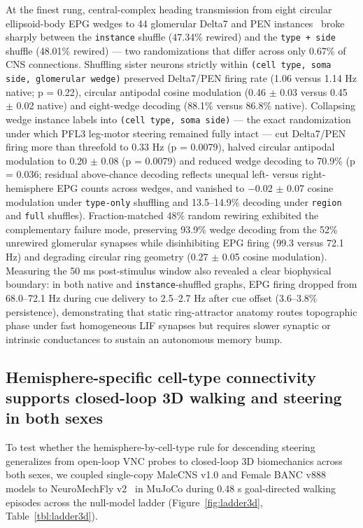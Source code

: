 \documentclass[11pt,a4paper]{article}
\begin{document}
At the finest rung, central-complex heading transmission from eight circular ellipsoid-body EPG wedges to 44 glomerular Delta7 and PEN instances~\cite{seelig2015neural,turnerevans2020ring,hulse2021connectome} broke sharply between the \texttt{instance} shuffle (47.34\% rewired) and the \texttt{type + side} shuffle (48.01\% rewired) --- two randomizations that differ across only 0.67\% of CNS connections. Shuffling sister neurons strictly within \texttt{(cell type, soma side, glomerular wedge)} preserved Delta7/PEN firing rate (1.06 versus 1.14 Hz native; p = 0.22), circular antipodal cosine modulation (0.46 $\pm$ 0.03 versus 0.45 $\pm$ 0.02 native) and eight-wedge decoding (88.1\% versus 86.8\% native). Collapsing wedge instance labels into \texttt{(cell type, soma side)} --- the exact randomization under which PFL3 leg-motor steering remained fully intact --- cut Delta7/PEN firing more than threefold to 0.33 Hz (p = 0.0079), halved circular antipodal modulation to 0.20 $\pm$ 0.08 (p = 0.0079) and reduced wedge decoding to 70.9\% (p = 0.036; residual above-chance decoding reflects unequal left- versus right-hemisphere EPG counts across wedges, and vanished to $-$0.02 $\pm$ 0.07 cosine modulation under \texttt{type-only} shuffling and 13.5--14.9\% decoding under \texttt{region} and \texttt{full} shuffles). Fraction-matched 48\% random rewiring exhibited the complementary failure mode, preserving 93.9\% wedge decoding from the 52\% unrewired glomerular synapses while disinhibiting EPG firing (99.3 versus 72.1 Hz) and degrading circular ring geometry (0.27 $\pm$ 0.05 cosine modulation). Measuring the 50 ms post-stimulus window also revealed a clear biophysical boundary: in both native and \texttt{instance}-shuffled graphs, EPG firing dropped from 68.0--72.1 Hz during cue delivery to 2.5--2.7 Hz after cue offset (3.6--3.8\% persistence), demonstrating that static ring-attractor anatomy routes topographic phase under fast homogeneous LIF synapses but requires slower synaptic or intrinsic conductances to sustain an autonomous memory bump.

\subsection{Hemisphere-specific cell-type connectivity supports closed-loop 3D walking and steering in both sexes}
To test whether the hemisphere-by-cell-type rule for descending steering generalizes from open-loop VNC probes to closed-loop 3D biomechanics across both sexes, we coupled single-copy MaleCNS v1.0 and Female BANC v888 models to NeuroMechFly v2~\cite{wangchen2024neuromechfly} in MuJoCo during 0.48 s goal-directed walking episodes across the null-model ladder (Figure~\ref{fig:ladder3d}, Table~\ref{tbl:ladder3d}).
\end{document}
